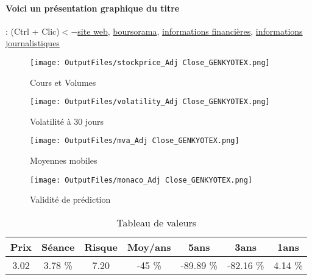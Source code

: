\documentclass[11pt,a4paper]{report}%
\begin{document}
\paragraph{Voici un présentation graphique du titre} : (Ctrl + Clic)$<-$\href{https://www.genkyotex.com/fr/110-fr/societe/investisseurs-et-partenariats/investisseurs/637-investisseurs}{site web}, \href{https://www.boursorama.com/cours/1rPGKTX}{boursorama}, \href{https://www.qwant.com/?q=site:https:%2f%2fwww.easybourse.com%2faction-societe%2fGENKYOTEX&t=web&client=ext-firefox-hp}{informations financières}, \href{https://bourse.lerevenu.com/cours-de-bourse/fiche-valeur-synthese/GENKYOTEX/GKTX-FR}{informations journalistiques}
\begin{figure}[!htb]
   \begin{minipage}{0.5\textwidth}
     \centering
     \texttt{[image: OutputFiles/stockprice\_Adj Close\_GENKYOTEX.png]}
     \caption{Cours et Volumes}\label{Fig:price_GENKYOTEX}
   \end{minipage}\hfill
   \begin{minipage}{0.5\textwidth}
     \centering
     \texttt{[image: OutputFiles/volatility\_Adj Close\_GENKYOTEX.png]}
     \caption{Volatilité à 30 jours}\label{Fig:volat_GENKYOTEX}
   \end{minipage}
\end{figure}
\begin{figure}[!htb]
   \begin{minipage}{0.5\textwidth}
     \centering
     \texttt{[image: OutputFiles/mva\_Adj Close\_GENKYOTEX.png]}
     \caption{Moyennes mobiles}\label{Fig:mva_GENKYOTEX}
   \end{minipage}\hfill
   \begin{minipage}{0.5\textwidth}
     \centering
     \texttt{[image: OutputFiles/monaco\_Adj Close\_GENKYOTEX.png]}
     \caption{Validité de prédiction}\label{Fig:prediction_GENKYOTEX}
   \end{minipage}
\end{figure}

\begin{table}[H]
  \centering
    \begin{tabular}{|c|c|c|c|c|c|c|}
    \hline
    Prix & Séance & Risque  & Moy/ans & 5ans & 3ans & 1ans \\
    \hline
    3.02 &    3.78 \%    & 7.20 & -45 \% & -89.89 \% & -82.16 \% & 4.14 \% \\
    \hline
    \end{tabular}%
        \label{tab:table_GENKYOTEX}%
      \caption{Tableau de valeurs}
\end{table}%
\end{document}
